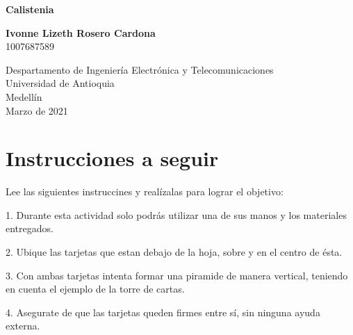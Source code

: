 \documentclass{article}
\begin{document}
\begin{titlepage}
    \begin{center}
        \vspace*{1cm}
            
        \Huge
        \textbf{Calistenia}
            
        \vspace{2 cm}
        \LARGE
    
            
        \vspace{2 cm}
            
        \textbf{Ivonne Lizeth Rosero Cardona}\\
        \large
        1007687589
            
        \vfill
            
        \vspace{0.8cm}
            
        \Large
        Despartamento de Ingeniería Electrónica y Telecomunicaciones\\
        Universidad de Antioquia\\
        Medellín\\
        Marzo de 2021
            
    \end{center}
\end{titlepage}

\tableofcontents
\newpage
\section{Instrucciones a seguir}\label{intro}
Lee las siguientes instruccines y realízalas para lograr el objetivo:

    1. Durante esta actividad solo podrás utilizar una de sus manos y los materiales entregados.
    
    2.  Ubique las tarjetas que estan debajo de la hoja, sobre y en el centro de ésta.
    
    3. Con ambas tarjetas intenta formar una piramide de manera vertical, teniendo en cuenta el ejemplo de la torre de cartas.
    
    4. Asegurate de que las tarjetas queden firmes entre sí, sin ninguna ayuda externa.
\end{document}
